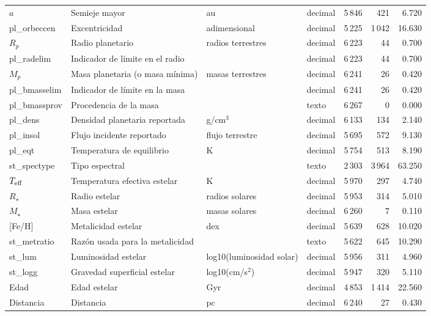 \begin{table}[htbp]
{\begin{tabular}{llllrrr}
    $a$ & Semieje mayor & au & decimal & 5\,846 & 421 & 6.720 \\
    pl\_orbeccen & Excentricidad & adimensional & decimal & 5\,225 & 1\,042 & 16.630 \\
    $R_p$ & Radio planetario & radios terrestres & decimal & 6\,223 & 44 & 0.700 \\
    pl\_radelim & Indicador de límite en el radio &  & decimal & 6\,223 & 44 & 0.700 \\
    $M_p$ & Masa planetaria (o masa mínima) & masas terrestres & decimal & 6\,241 & 26 & 0.420 \\
    pl\_bmasselim & Indicador de límite en la masa &  & decimal & 6\,241 & 26 & 0.420 \\
    pl\_bmassprov & Procedencia de la masa &  & texto & 6\,267 & 0 & 0.000 \\
    pl\_dens & Densidad planetaria reportada & g/cm$^{3}$ & decimal & 6\,133 & 134 & 2.140 \\
    pl\_insol & Flujo incidente reportado & flujo terrestre & decimal & 5\,695 & 572 & 9.130 \\
    pl\_eqt & Temperatura de equilibrio & K & decimal & 5\,754 & 513 & 8.190 \\
    st\_spectype & Tipo espectral &  & texto & 2\,303 & 3\,964 & 63.250 \\
    $T_{\rm eff}$ & Temperatura efectiva estelar & K & decimal & 5\,970 & 297 & 4.740 \\
    $R_\star$ & Radio estelar & radios solares & decimal & 5\,953 & 314 & 5.010 \\
    $M_\star$ & Masa estelar & masas solares & decimal & 6\,260 & 7 & 0.110 \\
    {[Fe/H]} & Metalicidad estelar & dex & decimal & 5\,639 & 628 & 10.020 \\
    st\_metratio & Razón usada para la metalicidad &  & texto & 5\,622 & 645 & 10.290 \\
    st\_lum & Luminosidad estelar & log10(luminosidad solar) & decimal & 5\,956 & 311 & 4.960 \\
    st\_logg & Gravedad superficial estelar & log10(cm/s$^{2}$) & decimal & 5\,947 & 320 & 5.110 \\
    Edad & Edad estelar & Gyr & decimal & 4\,853 & 1\,414 & 22.560 \\
    Distancia & Distancia & pc & decimal & 6\,240 & 27 & 0.430 \\
    \bottomrule
    \end{tabular}
    }
\end{table}
